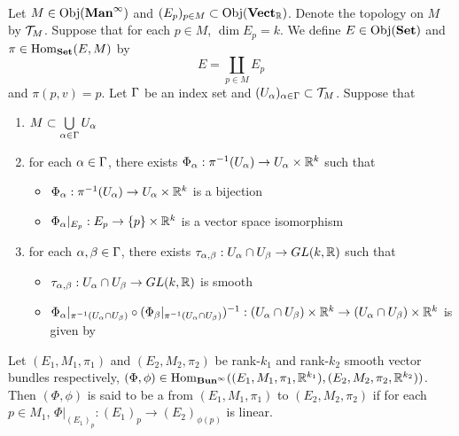 \documentclass{book}
\begin{document}
\begin{ex}   \\
	Let $M \in \operatorname{Obj}(\operatorname*{\text{\textbf{Man}}^{\infty}})$ and $(E_p)_{p \in M} \subset \operatorname{Obj}(\operatorname*{\text{\textbf{Vect}}_{\mathbb{R}}})$. Denote the topology on $M$ by $\mathcal{T}_M$. Suppose that for each $p \in M$, $\dim E_p = k$. We define $E \in \operatorname{Obj}(\operatorname*{\text{\textbf{Set}}})$ and $\pi \in \operatorname{Hom}_{\operatorname*{\text{\textbf{Set}}}}(E, M)$ by
	$$E = \coprod_{p \in M} E_p$$ 
	and 
	$\pi(p, v) = p$. Let $\Gamma$ be an index set and $(U_{\alpha})_{\alpha \in \Gamma} \subset \mathcal{T}_M$. Suppose that
	\begin{enumerate}
		\item $M \subset \bigcup\limits_{\alpha \in \Gamma} U_{\alpha}$
		\item for each $\alpha \in \Gamma$, there exists $\Phi_{\alpha}: \pi^{-1}(U_{\alpha}) \rightarrow U_{\alpha} \times \mathbb{R}^k$ such that 
		\begin{itemize}
			\item $\Phi_{\alpha} : \pi^{-1}(U_{\alpha}) \rightarrow U_{\alpha} \times \mathbb{R}^k$ is a bijection
			\item $\Phi_{\alpha}|_{E_p}:E_p \rightarrow \{p\} \times \mathbb{R}^k$ is a vector space isomorphism
		\end{itemize}
		\item for each $\alpha, \beta \in \Gamma$, there exists $\tau_{\alpha, \beta}: U_{\alpha} \cap U_{\beta} \rightarrow GL(k, \mathbb{R})$ such that 
		\begin{itemize}
			\item $\tau_{\alpha, \beta}: U_{\alpha} \cap U_{\beta} \rightarrow GL(k, \mathbb{R})$ is smooth
			\item $\Phi_{\alpha}|_{\pi^{-1}(U_{\alpha} \cap U_{\beta})} \circ (\Phi_{\beta}|_{\pi^{-1}(U_{\alpha} \cap U_{\beta})})^{-1}: (U_{\alpha} \cap U_{\beta}) \times \mathbb{R}^k \rightarrow (U_{\alpha} \cap U_{\beta}) \times \mathbb{R}^k$ is given by 
		\end{itemize}
	\end{enumerate}
\end{ex}

\begin{defn} 
	Let $(E_1, M_1, \pi_1)$ and $(E_2, M_2, \pi_2)$ be rank-$k_1$ and rank-$k_2$ smooth vector bundles respectively, $(\Phi, \phi) \in \operatorname{Hom}_{\operatorname*{\text{\textbf{Bun}}^{\infty}}}((E_1, M_1, \pi_1, \mathbb{R}^{k_1}), (E_2, M_2, \pi_2, \mathbb{R}^{k_2}))$. Then $(\Phi, \phi)$ is said to be a  from $(E_1, M_1, \pi_1)$ to $(E_2, M_2, \pi_2)$ if for each $p \in M_1$, $\Phi|_{(E_1)_p}: (E_1)_p \rightarrow (E_2)_{\phi(p)}$ is linear.
\end{defn}
\end{document}
